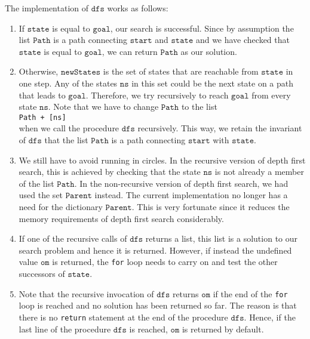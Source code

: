 The implementation of $\mathtt{dfs}$ works as follows:
\begin{enumerate}
\item If $\mathtt{state}$ is equal to $\mathtt{goal}$, our search is successful. Since by assumption
      the list $\mathtt{Path}$ is a path connecting $\mathtt{start}$ and $\mathtt{state}$ and we
      have checked that $\mathtt{state}$ is equal to $\mathtt{goal}$, we can return $\mathtt{Path}$ as our solution.
\item Otherwise, $\mathtt{newStates}$ is the set of states that are reachable from $\mathtt{state}$
      in one step.  Any of the states $\mathtt{ns}$ in this set could be the next state on a path
      that leads to $\mathtt{goal}$.  Therefore, we try recursively to reach $\mathtt{goal}$ from
      every state $\mathtt{ns}$.  Note that we have to change $\mathtt{Path}$ to the list
      \\[0.2cm]
      \hspace*{1.3cm}
      \texttt{Path + [ns]}
      \\[0.2cm]
      when we call the procedure $\mathtt{dfs}$ recursively.  This way, we retain the invariant of
      $\mathtt{dfs}$ that the list $\mathtt{Path}$ is a path connecting $\mathtt{start}$ with $\mathtt{state}$.
\item We still have to avoid running in circles.  In the recursive version of depth first search, 
      this is achieved by checking that the state $\mathtt{ns}$ is not already a member of the list $\mathtt{Path}$.  In the
      non-recursive version of depth first search, we had used the set $\mathtt{Parent}$ instead.
      The current implementation no longer has a need for the dictionary $\mathtt{Parent}$.  This is very 
      fortunate since it reduces the memory requirements of depth first search considerably.
\item If one of the recursive calls of $\mathtt{dfs}$ returns a list, this list is a solution to our
      search problem and hence it is returned.  However, if instead the undefined value
      $\mathtt{om}$ is returned, the \texttt{for} loop needs to carry on and test the other
      successors of $\mathtt{state}$.
\item Note that the recursive invocation of $\mathtt{dfs}$ returns $\mathtt{om}$ if the end of the
      \texttt{for} loop is reached and no solution has been returned so far.  The reason is that there is
      no \texttt{return} statement at the end of the procedure $\mathtt{dfs}$.  Hence, if the last
      line of the procedure $\mathtt{dfs}$ is reached, $\mathtt{om}$ is returned by default.
\end{enumerate}

